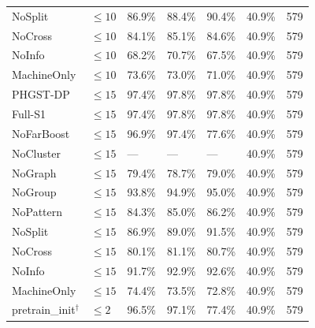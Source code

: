 \begin{table}[p]
\begin{tabularx}{\textwidth}{@{}lXXXXXX@{}}
NoSplit & $\le 10$ & 86.9\% & 88.4\% & 90.4\% & 40.9\% & 579 \\
NoCross & $\le 10$ & 84.1\% & 85.1\% & 84.6\% & 40.9\% & 579 \\
NoInfo & $\le 10$ & 68.2\% & 70.7\% & 67.5\% & 40.9\% & 579 \\
MachineOnly & $\le 10$ & 73.6\% & 73.0\% & 71.0\% & 40.9\% & 579 \\
\midrule
PHGST-DP & $\le 15$ & 97.4\% & 97.8\% & 97.8\% & 40.9\% & 579 \\
Full-S1 & $\le 15$ & 97.4\% & 97.8\% & 97.8\% & 40.9\% & 579 \\
NoFarBoost & $\le 15$ & 96.9\% & 97.4\% & 77.6\% & 40.9\% & 579 \\
NoCluster & $\le 15$ & --- & --- & --- & 40.9\% & 579 \\
NoGraph & $\le 15$ & 79.4\% & 78.7\% & 79.0\% & 40.9\% & 579 \\
NoGroup & $\le 15$ & 93.8\% & 94.9\% & 95.0\% & 40.9\% & 579 \\
NoPattern & $\le 15$ & 84.3\% & 85.0\% & 86.2\% & 40.9\% & 579 \\
NoSplit & $\le 15$ & 86.9\% & 89.0\% & 91.5\% & 40.9\% & 579 \\
NoCross & $\le 15$ & 80.1\% & 81.1\% & 80.7\% & 40.9\% & 579 \\
NoInfo & $\le 15$ & 91.7\% & 92.9\% & 92.6\% & 40.9\% & 579 \\
MachineOnly & $\le 15$ & 74.4\% & 73.5\% & 72.8\% & 40.9\% & 579 \\
\midrule
pretrain\_init$^\dagger$ & $\le 2$ & 96.5\% & 97.1\% & 77.4\% & 40.9\% & 579 \\
\bottomrule
\end{tabularx}
\end{table}

